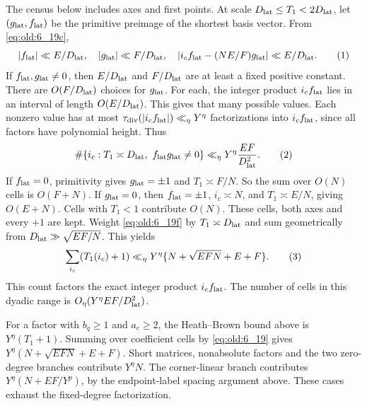 The census below includes axes and first points.  At scale
$D_{\rm lat}\le T_1<2D_{\rm lat}$, let $(g_{\rm lat},f_{\rm lat})$ be the
primitive preimage of the shortest basis vector.  From
\eqref{eq:old:6_19c},
\[
 |f_{\rm lat}|\ll E/D_{\rm lat},\quad |g_{\rm lat}|\ll F/D_{\rm lat},\quad
 |i_cf_{\rm lat}-(NE/F)g_{\rm lat}|\ll E/D_{\rm lat}.
\AutoTag{eq:old:6_19e}
\]
If $f_{\rm lat},g_{\rm lat}\ne0$, then $E/D_{\rm lat}$ and $F/D_{\rm lat}$
are at least a fixed positive constant.  There are $O(F/D_{\rm lat})$
choices for $g_{\rm lat}$.  For each, the integer product $i_cf_{\rm lat}$
lies in an interval of length $O(E/D_{\rm lat})$.  This gives that many
possible values.  Each nonzero value has at most
$\tau_{\mathrm{div}}(|i_cf_{\rm lat}|)\ll_\eta Y^\eta$ factorizations into
$i_c f_{\rm lat}$, since all factors have polynomial height.  Thus
\[
 \#\{i_c:T_1\asymp D_{\rm lat},\ f_{\rm lat}g_{\rm lat}\ne0\}
 \ll_\eta Y^\eta \frac{EF}{D_{\rm lat}^2}.
\AutoTag{eq:old:6_19f}
\]
If $f_{\rm lat}=0$, primitivity gives $g_{\rm lat}=\pm1$ and
$T_1\asymp F/N$.  So the sum over $O(N)$ cells is $O(F+N)$.  If
$g_{\rm lat}=0$, then $f_{\rm lat}=\pm1$, $i_c\asymp N$, and
$T_1\asymp E/N$, giving $O(E+N)$.  Cells with $T_1<1$ contribute $O(N)$.
These cells, both axes and every $+1$ are kept.  Weight
\eqref{eq:old:6_19f} by $T_1\asymp D_{\rm lat}$ and sum geometrically
from $D_{\rm lat}\gg\sqrt{EF/N}$.  This yields
\[
 \sum_{i_c}(T_1(i_c)+1)\ll_\eta
 Y^\eta\{N+\sqrt{EFN}+E+F\}.
\AutoTag{eq:old:6_19}
\]
This count factors the exact integer product \(i_cf_{\rm lat}\). The number
of cells in this dyadic range is
\(O_\eta(Y^\eta EF/D_{\rm lat}^2)\).

For a factor with $b_q\ge1$ and $a_c\ge2$, the Heath--Brown bound above
is $Y^\eta(T_1+1)$.  Summing over coefficient cells by \eqref{eq:old:6_19}
gives $Y^\eta(N+\sqrt{EFN}+E+F)$.  Short matrices, nonabsolute factors and
the two zero-degree branches contribute $Y^\eta N$.  The corner-linear
branch contributes $Y^\eta(N+EF/Y^p)$, by the endpoint-label spacing
argument above.  These cases exhaust the fixed-degree factorization.

